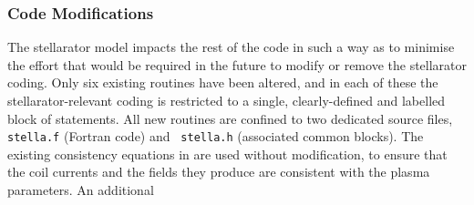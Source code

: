 \subsubsection{Code Modifications}
The stellarator model impacts the rest of the code in such a way as to
minimise the effort that would be required in the future to modify or remove
the stellarator coding. Only six existing routines have been altered, and in
each of these the stellarator-relevant coding is restricted to a single,
clearly-defined and labelled block of statements. All new routines are
confined to two dedicated source files, {\tt stella.f} (Fortran code) and {\tt
stella.h} (associated common blocks). The existing consistency equations in
\PS are used without modification, to ensure that the coil currents and the
fields they produce are consistent with the plasma parameters. An additional
